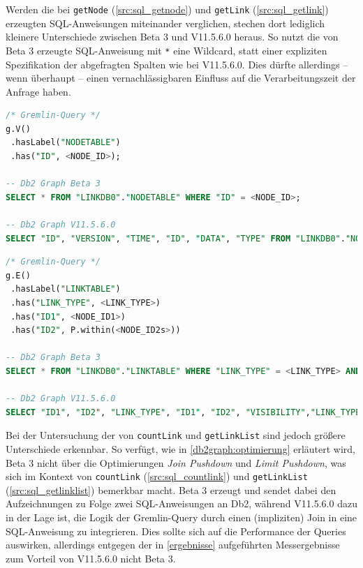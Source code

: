 Werden die bei \texttt{getNode} (\autoref{src:sql_getnode}) und \texttt{getLink} (\autoref{src:sql_getlink}) erzeugten SQL-Anweisungen miteinander verglichen,  stechen dort lediglich kleinere Unterschiede zwischen Beta 3 und V11.5.6.0 heraus. So nutzt die von Beta 3 erzeugte SQL-Anweisung mit \texttt{*} eine Wildcard, statt einer expliziten Spezifikation der abgefragten Spalten wie bei V11.5.6.0. Dies dürfte allerdings -- wenn überhaupt -- einen vernachlässigbaren Einfluss auf die Verarbeitungszeit der Anfrage haben.

\begin{lstlisting}[caption={Generierter SQL-Code getNode},label=src:sql_getnode,language=SQL]
/* Gremlin-Query */
g.V()
 .hasLabel("NODETABLE")
 .has("ID", <NODE_ID>);

-- Db2 Graph Beta 3
SELECT * FROM "LINKDB0"."NODETABLE" WHERE "ID" = <NODE_ID>;

-- Db2 Graph V11.5.6.0
SELECT "ID", "VERSION", "TIME", "ID", "DATA", "TYPE" FROM "LINKDB0"."NODETABLE" WHERE "ID" = <NODE_ID>;
\end{lstlisting}

\begin{lstlisting}[caption={Generierter SQL-Code getLink},label=src:sql_getlink,language=SQL]
/* Gremlin-Query */
g.E()
 .hasLabel("LINKTABLE")
 .has("LINK_TYPE", <LINK_TYPE>)
 .has("ID1", <NODE_ID1>)
 .has("ID2", P.within(<NODE_ID2s>))

-- Db2 Graph Beta 3
SELECT * FROM "LINKDB0"."LINKTABLE" WHERE "LINK_TYPE" = <LINK_TYPE> AND "ID1" = <NODE_ID1> AND "ID2" IN (VALUES <NODE_ID2_0>, <NODE_ID2_1>, <...>);

-- Db2 Graph V11.5.6.0
SELECT "ID1", "ID2", "LINK_TYPE", "ID1", "ID2", "VISIBILITY","LINK_TYPE", "DATA", "ID2", "ID1", "VERSION", "TIME" FROM "LINKDB0"."LINKTABLE" WHERE "LINK_TYPE" = <LINK_TYPE> AND "ID1" = <NODE_ID1> AND "ID2" IN (VALUES <NODE_ID2_0>, <NODE_ID2_1>, <...>);
\end{lstlisting}

Bei der Untersuchung der von \texttt{countLink} und \texttt{getLinkList} sind jedoch größere Unterschiede erkennbar. So verfügt, wie in \autoref{db2graph:optimierung} erläutert wird, Beta 3 nicht über die Optimierungen \textit{Join Pushdown} und \textit{Limit Pushdown}, was sich im Kontext von \texttt{countLink} (\autoref{src:sql_countlink}) und \texttt{getLinkList} (\autoref{src:sql_getlinklist}) bemerkbar macht. Beta 3 erzeugt und sendet dabei den Aufzeichnungen zu Folge zwei SQL-Anweisungen an Db2, während V11.5.6.0 dazu in der Lage ist, die Logik der Gremlin-Query durch einen (impliziten) Join in eine SQL-Anweisung zu integrieren. Dies sollte sich auf die Performance der Queries auswirken, allerdings entgegen der in \autoref{ergebnisse} aufgeführten Messergebnisse zum Vorteil von V11.5.6.0 nicht Beta 3. 

